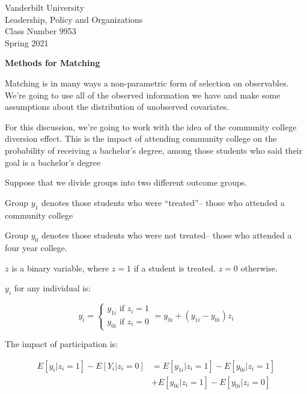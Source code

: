 \documentclass[12pt]{article}
\begin{document}
\thispagestyle{empty}%


\setmarginsrb{1in}{.5in}{.1in}{.5in}{0pt}{0mm}{0pt}{0mm}%

\setlength{\parskip}{1ex plus 0.5ex minus 0.2ex}

\setcounter{secnumdepth}{-2}


\begin{flushleft}
Vanderbilt University\\Leadership, Policy and Organizations\\Class Number 9953\\ Spring 2021
\end{flushleft}

\begin{center}
\textbf{Methods for Matching}
\end{center}


Matching is in many ways a non-parametric form of
selection on observables. We're going to use all of the observed
information we have and make some assumptions about the distribution
of unobserved covariates. 

For this discussion, we're going to work with the idea of the
community college diversion effect. This is the impact of attending
community college on the probability of receiving a bachelor's
degree, among those students who said their goal is a bachelor's degree

Suppose that we divide groups into two different outcome groups.

Group $y_1$ denotes those students who were ``treated''-- those who
attended a community college

Group $y_0$ denotes those students who were not treated-- those who
attended a four year college. 

$z$ is a binary variable, where $z=1$ if a student is treated. 
$z=0$ otherwise. 

$y_i$ for any individual is:

\begin{equation*}
  y_i=
\begin{cases}
  y_{1i} \text{ if } z_i=1 \\
y_{0i} \text{ if } z_i=0
\end{cases}=
y_{0i}+(y_{1i}-y_{0i})z_i
\end{equation*}

The impact of participation is:
 
\begin{align*}
  E[y_i|z_i=1]-E[Y_i|z_i=0]&=E[y_{1i}|z_i=1]-E[y_{0i}|z_i=1]\\
                           &+E[y_{0i}|z_i=1]-E[y_{0i}|z_i=0]
\end{align*}
\end{document}
